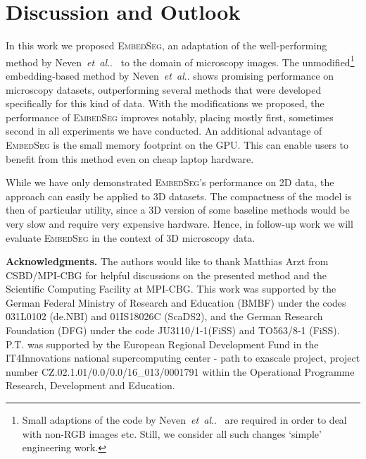 \documentclass{midl}
\makeatletter
\newcommand{\EmbedSeg}{\mbox{\textsc{EmbedSeg}}\xspace}
\newcommand{\miniheadline}[1]{\noindent\textbf{#1.}}
\DeclareRobustCommand\onedot{\futurelet\@let@token\@onedot}
\def\@onedot{\ifx\@let@token.\else.\null\fi\xspace}
\def\etal{\emph{et~al}\onedot}
\makeatother
\begin{document}
\section{Discussion and Outlook}
\label{sec:discussion}
In this work we proposed \EmbedSeg, an adaptation of the well-performing method by Neven~\etal~\cite{neven2019} to the domain of microscopy images.
The unmodified\footnote{Small adaptions of the code by Neven~\etal~\cite{neven2019} are required in order to deal with non-RGB images etc. Still, we consider all such changes `simple' engineering work.} embedding-based method by Neven~\etal shows promising performance on microscopy datasets, outperforming several methods that were developed specifically for this kind of data.
With the modifications we proposed, the performance of \EmbedSeg improves notably, placing mostly first, sometimes second in all experiments we have conducted.
An additional advantage of \EmbedSeg is the small memory footprint on the GPU. 
This can enable users to benefit from this method even on cheap laptop hardware.

While we have only demonstrated \EmbedSeg's performance on 2D data, the approach can easily be applied to 3D datasets.
The compactness of the model is then of particular utility, since a 3D version of some baseline methods would be very slow and require very expensive hardware. 
Hence, in follow-up work we will evaluate \EmbedSeg in the context of 3D microscopy data.


\vspace{1em}
\miniheadline{Acknowledgments}
{\small
The authors would like to thank Matthias Arzt from CSBD/MPI-CBG for helpful discussions on the presented method and the Scientific Computing Facility at MPI-CBG. 
This work was supported by the German Federal Ministry of Research and Education (BMBF) under the codes 031L0102 (de.NBI) and 01IS18026C (ScaDS2), and the German Research Foundation (DFG) under the code JU3110/1-1(FiSS) and TO563/8-1 (FiSS).
P.T. was supported by the European Regional Development Fund in the IT4Innovations national supercomputing center - path to exascale project, project number CZ.02.1.01/0.0/0.0/16\_013/0001791 within the Operational Programme Research, Development and Education.
}
\end{document}
